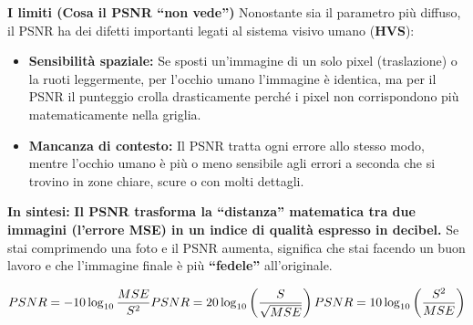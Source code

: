 \begin{itemize}
  \textbf{I limiti (Cosa il PSNR ``non vede'')} Nonostante sia il
  parametro più diffuso, il PSNR ha dei difetti importanti legati al
  sistema visivo umano (\textbf{HVS}):

  \begin{itemize}
  \tightlist
  \item
    \textbf{Sensibilità spaziale:} Se sposti un'immagine di un solo
    pixel (traslazione) o la ruoti leggermente, per l'occhio umano
    l'immagine è identica, ma per il PSNR il punteggio crolla
    drasticamente perché i pixel non corrispondono più matematicamente
    nella griglia.
  \item
    \textbf{Mancanza di contesto:} Il PSNR tratta ogni errore allo
    stesso modo, mentre l'occhio umano è più o meno sensibile agli
    errori a seconda che si trovino in zone chiare, scure o con molti
    dettagli.
  \end{itemize}

  \textbf{In sintesi:} \textbf{Il PSNR trasforma la ``distanza''
  matematica tra due immagini (l'errore MSE) in un indice di qualità
  espresso in decibel.} Se stai comprimendo una foto e il PSNR aumenta,
  significa che stai facendo un buon lavoro e che l'immagine finale è
  più \textbf{``fedele''} all'originale.

  \[
    PSNR = -10 \log_{10} \frac{MSE}{S^2}
    \\
    \\
    PSNR = 20 \log_{10} \left( \frac{S}{\sqrt{MSE}} \right)
    \\
    \\
    PSNR = 10 \log_{10} \left( \frac{S^2}{MSE} \right)
    \]
\end{itemize}
